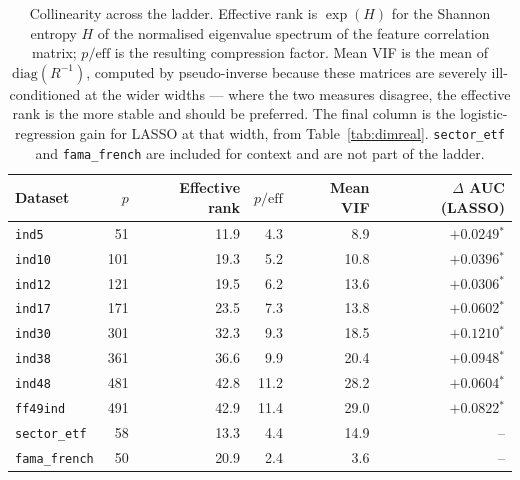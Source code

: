\begin{table}[htbp]
    \centering
    \small\setlength{\tabcolsep}{5pt}
    \begin{tabular}{lrrrrr}
    \hline
    Dataset & $p$ & Effective rank & $p/\mathrm{eff}$ & Mean VIF & $\Delta$ AUC (LASSO) \\
    \hline
    \texttt{ind5} & 51 & 11.9 & 4.3 & 8.9 & $+0.0249$$^{*}$ \\
    \texttt{ind10} & 101 & 19.3 & 5.2 & 10.8 & $+0.0396$$^{*}$ \\
    \texttt{ind12} & 121 & 19.5 & 6.2 & 13.6 & $+0.0306$$^{*}$ \\
    \texttt{ind17} & 171 & 23.5 & 7.3 & 13.8 & $+0.0602$$^{*}$ \\
    \texttt{ind30} & 301 & 32.3 & 9.3 & 18.5 & $+0.1210$$^{*}$ \\
    \texttt{ind38} & 361 & 36.6 & 9.9 & 20.4 & $+0.0948$$^{*}$ \\
    \texttt{ind48} & 481 & 42.8 & 11.2 & 28.2 & $+0.0604$$^{*}$ \\
    \texttt{ff49ind} & 491 & 42.9 & 11.4 & 29.0 & $+0.0822$$^{*}$ \\
    \texttt{sector\_etf} & 58 & 13.3 & 4.4 & 14.9 & -- \\
    \texttt{fama\_french} & 50 & 20.9 & 2.4 & 3.6 & -- \\
    \hline
    \end{tabular}
    \caption{Collinearity across the ladder. Effective rank is $\exp(H)$ for the Shannon entropy $H$ of the normalised eigenvalue spectrum of the feature correlation matrix; $p/\mathrm{eff}$ is the resulting compression factor. Mean VIF is the mean of $\mathrm{diag}(R^{-1})$, computed by pseudo-inverse because these matrices are severely ill-conditioned at the wider widths --- where the two measures disagree, the effective rank is the more stable and should be preferred. The final column is the logistic-regression gain for LASSO at that width, from Table~\ref{tab:dimreal}. \texttt{sector\_etf} and \texttt{fama\_french} are included for context and are not part of the ladder.}
    \label{tab:collinearity}
\end{table}
